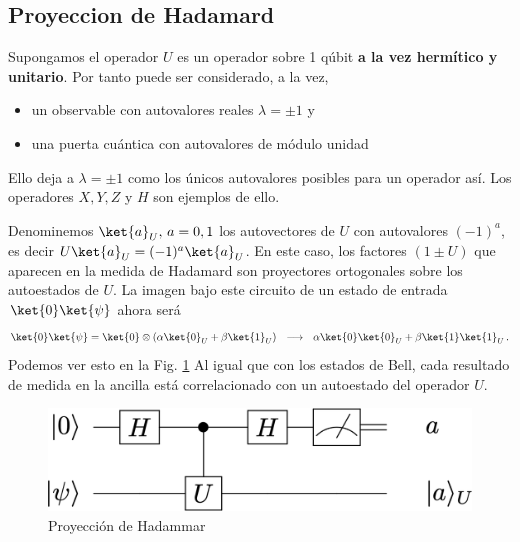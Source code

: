 \documentclass[a4paper,11pt]{book} %
\numberwithin{equation}{chapter}
\begin{document}
        \subsection{Proyeccion de Hadamard}

Supongamos el operador $U$ es un operador sobre 1 qúbit \textbf{a la vez hermítico y unitario}. Por tanto puede ser considerado, a la vez, 
\begin{itemize}
	\item un observable con autovalores reales  $\lambda = \pm1$ y 
	\item una puerta cuántica con autovalores de módulo unidad
\end{itemize}
Ello deja a $\lambda = \pm 1$ como los únicos autovalores posibles para un operador así. Los operadores $X,Y,Z$ y $H$ son ejemplos de ello. 

Denominemos $\ket{a}_U, \, a=0,1$  los autovectores de $U$ con autovalores $(-1)^a$, es decir $U\ket{a}_U = (-1)^a\ket{a}_U$. En este caso, los factores $(1\pm U)$ que aparecen en la medida de Hadamard son proyectores ortogonales sobre los autoestados de $U$. La imagen bajo este circuito de un estado de entrada $\ket{0}\ket{\psi}$ ahora será
	\begin{equation}
	\ket{0}\ket{\psi} = \ket{0}\otimes (\alpha\ket{0}_U + \beta\ket{1}_U) ~~\longrightarrow ~~  \alpha\ket{0}\ket{0}_U +  \beta\ket{1}\ket{1}_U\, .
	\end{equation}
Podemos ver esto en la Fig. \ref{Fig_medidas2_HadamardProjection}  Al igual que con los estados de Bell, cada resultado de  medida en la ancilla está correlacionado con un autoestado del operador $U$.

	\begin{figure}[H]
	\centering 
	\includegraphics[width=0.4\linewidth]{Figuras/Fig_medidas2_HadamardProjection}
	\caption{Proyección de Hadammar}
	\label{Fig_medidas2_HadamardProjection}
	\end{figure}
\end{document}

